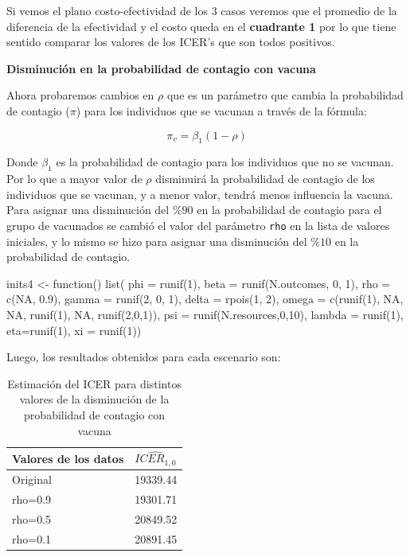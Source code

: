 \documentclass[12pt]{article}
\begin{document}
Si vemos el plano costo-efectividad de los 3 casos veremos que el promedio de la diferencia de la efectividad y el costo queda en el \textbf{cuadrante 1} por lo que tiene sentido comparar los valores de los ICER's que son todos positivos.

\begin{center}
    \textbf{Disminución en la probabilidad de contagio con vacuna}
\end{center}

Ahora probaremos cambios en $\rho$ que es un parámetro que cambia la probabilidad de contagio ($\pi$) para los individuos que se vacunan a través de la fórmula:

\begin{equation}
    \pi_v = \beta_1 (1-\rho)
\end{equation}

Donde $\beta_1$ es la probabilidad de contagio para los individuos que no se vacunan. Por lo que a mayor valor de $\rho$ disminuirá la probabilidad de contagio de los individuos que se vacunan, y a menor valor, tendrá menos influencia la vacuna.\\

Para asignar una disminución del $\%90$ en la probabilidad de contagio para el grupo de vacunados se cambió el valor del parámetro \texttt{rho} en la lista de valores iniciales, y lo mismo se hizo para asignar una disminución del $\%10$ en la probabilidad de contagio.

\begin{Rcode}
    
inits4 <- function(){
list(
phi = runif(1), beta = runif(N.outcomes, 0, 1), rho = c(NA, 0.9), gamma = runif(2, 0, 1), delta = rpois(1, 2), omega = c(runif(1), NA, NA, runif(1), NA, runif(2,0,1)), psi = runif(N.resources,0,10), lambda = runif(1), eta=runif(1), xi = runif(1))
}

\end{Rcode}

Luego, los resultados obtenidos para cada escenario son: 

\begin{table}[ht]
\centering
\begin{tabular}{ll}
  \hline
 Valores de los datos & $\widehat{ICER_{1,0}}$ \\ 
  \hline
 Original & 19339.44 \\ 
 rho=0.9 & 19301.71 \\ 
 rho=0.5 & 20849.52 \\ 
 rho=0.1 & 20891.45 \\ 
   \hline
\end{tabular}
\caption{Estimación del ICER para distintos valores de la disminución de la probabilidad de contagio con vacuna}
\label{tabla:cambio_influencia}
\end{table}
\end{document}

